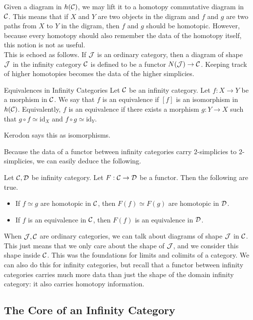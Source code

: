 \documentclass[a4paper]{article}
\begin{document}
Given a diagram in $h(\mathcal{C})$, we may lift it to a homotopy commutative diagram in $\mathcal{C}$. This means that if $X$ and $Y$ are two objects in the digram and $f$ and $g$ are two paths from $X$ to $Y$ in the digram, then $f$ and $g$ should be homotopic. However, because every homotopy should also remember the data of the homotopy itself, this notion is not as useful. \\

This is echoed as follows. If $\mathcal{J}$ is an ordinary category, then a diagram of shape $\mathcal{J}$ in the infinity category $\mathcal{C}$ is defined to be a functor $N(\mathcal{J})\to\mathcal{C}$. Keeping track of higher homotopies becomes the data of the higher simplicies. 

\begin{defn}{Equivalences in Infinity Categories}{} Let $\mathcal{C}$ be an infinity category. Let $f:X\to Y$ be a morphism in $\mathcal{C}$. We say that $f$ is an equivalence if $[f]$ is an isomorphism in $h(\mathcal{C})$. Equivalently, $f$ is an equivalence if there exists a morphism $g:Y\to X$ such that $g\circ f\simeq\text{id}_X$ and $f\circ g\simeq\text{id}_Y$. 
\end{defn}

Kerodon says this as isomorphisms. 

Because the data of a functor between infinity categories carry $2$-simplicies to $2$-simplicies, we can easily deduce the following. 

\begin{lmm}{}{} Let $\mathcal{C},\mathcal{D}$ be infinity category. Let $F:\mathcal{C}\to\mathcal{D}$ be a functor. Then the following are true. 
\begin{itemize}
\item If $f\simeq g$ are homotopic in $\mathcal{C}$, then $F(f)\simeq F(g)$ are homotopic in $\mathcal{D}$. 
\item If $f$ is an equivalence in $\mathcal{C}$, then $F(f)$ is an equivalence in $\mathcal{D}$. 
\end{itemize}
\end{lmm}

When $\mathcal{J},\mathcal{C}$ are ordinary categories, we can talk about diagrams of shape $\mathcal{J}$ in $\mathcal{C}$. This just means that we only care about the shape of $\mathcal{J}$, and we consider this shape inside $\mathcal{C}$. This was the foundations for limits and colimits of a category. We can also do this for infinity categories, but recall that a functor between infinity categories carries much more data than just the shape of the domain infinity category: it also carries homotopy information. 


\subsection{The Core of an Infinity Category}
\end{document}
